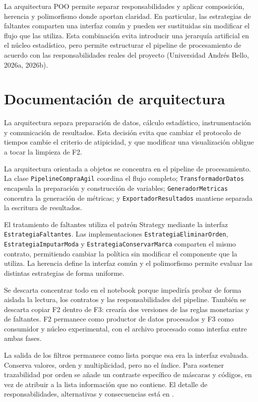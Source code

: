 \documentclass[11pt,letterpaper]{article}
\begin{document}
La arquitectura POO permite separar responsabilidades y aplicar composición, herencia y
polimorfismo donde aportan claridad. En particular, las estrategias de faltantes comparten una
interfaz común y pueden ser sustituidas sin modificar el flujo que las utiliza. Esta combinación
evita introducir una jerarquía artificial en el núcleo estadístico, pero permite estructurar el
pipeline de procesamiento de acuerdo con las responsabilidades reales del proyecto
(Universidad Andrés Bello, 2026a, 2026b).

\section{Documentación de arquitectura}
La arquitectura separa preparación de datos, cálculo estadístico, instrumentación y comunicación
de resultados. Esta decisión evita que cambiar el protocolo de tiempos cambie el criterio de
atipicidad, y que modificar una visualización obligue a tocar la limpieza de F2.

La arquitectura orientada a objetos se concentra en el pipeline de procesamiento. La clase
\texttt{PipelineCompraAgil} coordina el flujo completo; \texttt{TransformadorDatos} encapsula
la preparación y construcción de variables; \texttt{GeneradorMetricas} concentra la generación
de métricas; y \texttt{ExportadorResultados} mantiene separada la escritura de resultados.

El tratamiento de faltantes utiliza el patrón Strategy mediante la interfaz
\texttt{EstrategiaFaltantes}. Las implementaciones
\texttt{EstrategiaEliminar\allowbreak Orden}, \texttt{EstrategiaImputar\allowbreak Moda} y
\texttt{EstrategiaConservar\allowbreak Marca} comparten el mismo contrato,
permitiendo cambiar la política sin modificar el componente que la utiliza. La herencia define
la interfaz común y el polimorfismo permite evaluar las distintas estrategias de forma uniforme.

Se descarta concentrar todo en el notebook porque impediría probar de forma aislada la lectura,
los contratos y las responsabilidades del pipeline. También se descarta copiar F2 dentro de F3:
crearía dos versiones de las reglas monetarias y de faltantes. F2 permanece como productor de
datos procesados y F3 como consumidor y núcleo experimental, con el archivo procesado como
interfaz entre ambas fases.

La salida de los filtros permanece como lista porque esa era la interfaz evaluada. Conserva
valores, orden y multiplicidad, pero no el índice. Para sostener trazabilidad por orden se añade
un contraste específico de máscaras y códigos, en vez de atribuir a la lista información que
no contiene. El detalle de responsabilidades, alternativas y consecuencias está en
.
\end{document}
